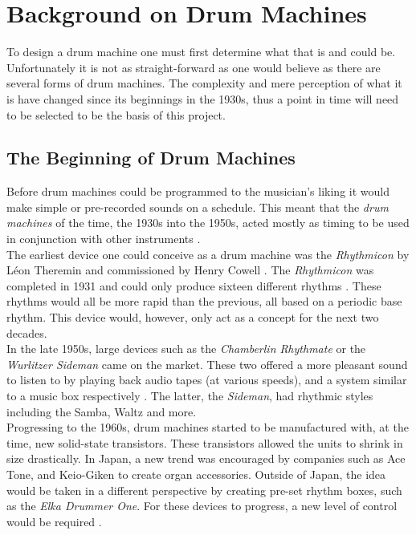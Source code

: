 \documentclass[12pt,a4paper]{report}
\begin{document}
\chapter{Background on Drum Machines}
To design a drum machine one must first determine what that is and could be. Unfortunately it is not as straight-forward as one would believe as there are several forms of drum machines. The complexity and mere perception of what it is have changed since its beginnings in the 1930s, thus a point in time will need to be selected to be the basis of this project.
\section{The Beginning of Drum Machines}
Before drum machines could be programmed to the musician's liking it would make simple or pre-recorded sounds on a schedule. This meant that the \textit{drum machines} of the time, the 1930s into the 1950s, acted mostly as timing to be used in conjunction with other instruments \cite{rhythmart}. \\
The earliest device one could conceive as a drum machine was the \textit{Rhythmicon} by L\'eon Theremin and commissioned by Henry Cowell \cite{rhythmart, beatgoeson}. The \textit{Rhythmicon} was completed in 1931 and could only produce sixteen different rhythms \cite{schedel}. These rhythms would all be more rapid than the previous, all based on a periodic base rhythm. This device would, however, only act as a concept for the next two decades. \\
In the late 1950s, large devices such as the \textit{Chamberlin Rhythmate} or the \textit{Wurlitzer Sideman} came on the market. These two offered a more pleasant sound to listen to by playing back audio tapes (at various speeds), and a system similar to a music box respectively \cite{rhythmart, beatgoeson}. The latter, the \textit{Sideman}, had rhythmic styles including the Samba, Waltz and more\cite{WangOliver2014Htdm}. \\
Progressing to the 1960s, drum machines started to be manufactured with, at the time, new solid-state transistors. These transistors allowed the units to shrink in size drastically. In Japan, a new trend was encouraged by companies such as Ace Tone, and Keio-Giken to create organ accessories. Outside of Japan, the idea would be taken in a different perspective by creating pre-set rhythm boxes, such as the \textit{Elka Drummer One}. For these devices to progress, a new level of control would be required \cite{rhythmart}.
\end{document}

